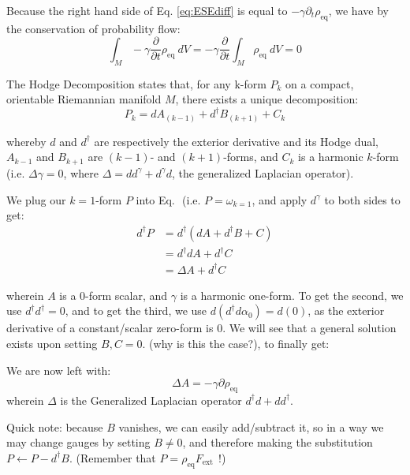 \documentclass[%
 reprint,
 amsmath,amssymb,
 aps,
]{revtex4-2}
\begin{document}
Because the right hand side of Eq. \ref{eq:ESEdiff} is equal to $-\gamma \partial_t \rho_\mathrm{eq}$, we have by the conservation of probability flow:
\begin{equation}
    \int_{M} -\gamma \frac{\partial}{\partial t} \rho_\mathrm{eq} \ dV = -\gamma \frac{\partial}{\partial t} \int_{M} \rho_\mathrm{eq} \ dV = 0
\end{equation}


The Hodge Decomposition states that, for any k-form $P_k$ on a compact, orientable Riemannian manifold $M$, there exists a unique decomposition:
\begin{equation} \label{eq:hodgeD}
    P_k = d A_{(k-1)} + d^{\dagger}B_{(k+1)} + C_k
\end{equation}

whereby $d$ and $d^{\dagger}$ are respectively the exterior derivative and its Hodge dual, $A_{k-1}$ and $B_{k+1}$ are $(k-1)$- and $(k+1)$-forms, and $C_k$ is a harmonic $k$-form (i.e. $\Delta \gamma = 0$, where $\Delta = d d^{\gamma} + d^{\gamma} d$, the generalized Laplacian operator).

We plug  our $k=1$-form $P$ into Eq. $\label{eq:hodgeD}$ (i.e. $P = \omega_{k=1}$, and apply $d^{\gamma}$ to both sides to get:
\begin{align*}
  d^{\dagger} P &= d^{\dagger}(d A + d^{\dagger}B + C) \\
  &= d^{\dagger} d A + d^{\dagger} C \\
  &= \Delta A + d^{\dagger} C
\end{align*}

wherein $A$ is a $0$-form scalar, and $\gamma$ is a harmonic one-form. To get the second, we use $d^{\dagger}d^{\dagger} = 0$, and to get the third, we use $d (d^{\dagger} d \alpha_{0}) = d(0)$, as the exterior derivative of a constant/scalar zero-form is 0.  We will see that a general solution exists upon setting $B, C = 0$. (why is this the case?), to finally get:

We are now left with:
\begin{equation} \label{eq:ESEManifold}
  \Delta A = -\gamma \partial \rho_{\mathrm{eq}}
\end{equation}
wherein $\Delta$ is the Generalized Laplacian operator $d^{\dagger}d + d d^{\dagger}$.

Quick note: because $B$ vanishes, we can easily add/subtract it, so in a way we may change gauges by setting $B \neq 0$, and therefore making the substitution $P \leftarrow P - d^{\dagger} B $. (Remember that $P = \rho_{\mathrm{eq}} F_{\mathrm{ext}}\ \ $!)
\end{document}
